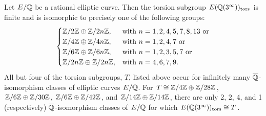 \begin{frame}[plain]
\footnotesize
\begin{thm}
Let $E/\mathbb{Q}$ be a rational elliptic curve. Then the torsion subgroup $E(\mathbb{Q}(3^\infty))_{\text{tors}}$ is finite and is isomorphic to precisely one of the following groups:
	\[
	\begin{cases}
	\mathbb{Z}/2\mathbb{Z} \oplus \mathbb{Z}/2n\mathbb{Z}, & \text{with } n= 1, 2, 4, 5, 7, 8, 13 \text{ or} \\
	\mathbb{Z}/4\mathbb{Z} \oplus \mathbb{Z}/4n\mathbb{Z}, & \text{with } n= 1, 2, 4, 7 \text{ or} \\
	\mathbb{Z}/6\mathbb{Z} \oplus \mathbb{Z}/6n\mathbb{Z}, & \text{with } n= 1, 2, 3, 5, 7 \text{ or} \\
	\mathbb{Z}/2n\mathbb{Z} \oplus \mathbb{Z}/2n\mathbb{Z}, & \text{with } n= 4, 6, 7, 9. \\
	\end{cases}
	\]
All but four of the torsion subgroups, $T$, listed above occur for infinitely many $\overline{\mathbb{Q}}$-isomorphism classes of elliptic curves $E/\mathbb{Q}$. For $T \cong \mathbb{Z}/4\mathbb{Z} \oplus \mathbb{Z}/28\mathbb{Z}$, $\mathbb{Z}/6\mathbb{Z} \oplus \mathbb{Z}/30\mathbb{Z}$, $\mathbb{Z}/6\mathbb{Z} \oplus \mathbb{Z}/42\mathbb{Z}$, and $\mathbb{Z}/14\mathbb{Z} \oplus \mathbb{Z}/14\mathbb{Z}$, there are only 2, 2, 4, and 1 (respectively) $\overline{\mathbb{Q}}$-isomorphism classes of $E/\mathbb{Q}$ for which $E(\mathbb{Q}(3^\infty))_{\text{tors}} \cong T$. 
\end{thm}
	\begin{figure}[h]
	\centering
	\begin{subfigure}{0.23\textwidth}
	\captionsetup{labelformat=empty}
	\centering

\end{subfigure}
\end{figure}
\end{frame}
